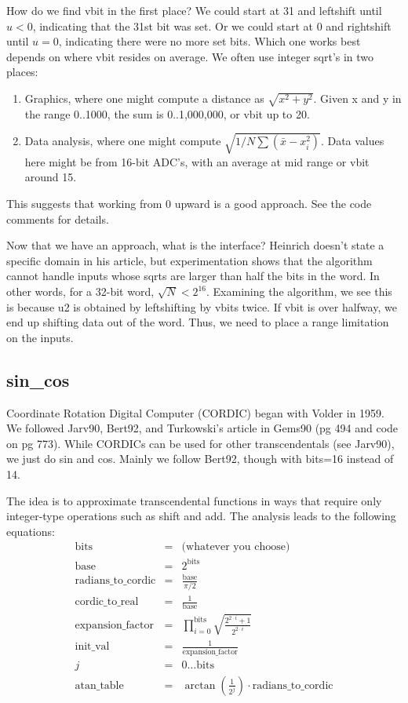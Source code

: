 How do we find vbit in the first place?  
We could start at 31 and leftshift 
until $u<0$, indicating that the 31st bit was set.  Or we could
start at 0 and rightshift until $u=0$, indicating there were no
more set bits. Which one works best depends on where vbit
resides on average.  We often use integer sqrt's in two places:
\begin{enumerate}
\item Graphics, where one might compute a distance as $\sqrt{x^2+y^2}$.  
Given x and y in the range 0..1000, the sum is 0..1,000,000, or
vbit up to 20.
\item Data analysis, where one might compute $\sqrt{1/N\sum{(\bar{x}-x_i^2)}}$.  
Data values here might be from 16-bit ADC's, with an average at mid range
or vbit around 15.  
\end{enumerate}

This suggests that working from 0 upward is a good approach.  
See the code comments for details.

Now that we have an approach, what is the interface?  Heinrich doesn't
state a specific domain in his article, but experimentation shows
that the algorithm cannot handle inputs whose sqrts are 
larger than half the bits in the word.  In other words, for a 32-bit word, 
$\sqrt{N} < 2^{16}$.  Examining the algorithm, we see this is because 
u2 is obtained by leftshifting by vbits twice.  If vbit is over
halfway, we end up shifting data out of the word.
Thus, we need to place a range limitation on the inputs.

\subsection*{sin\_cos}
Coordinate Rotation Digital Computer (CORDIC) began with Volder in 1959.
We followed Jarv90, Bert92, and Turkowski's article in Gems90 (pg
494 and code on pg 773). While CORDICs can be used for other 
transcendentals (see Jarv90), we just do sin and cos.  Mainly we
follow Bert92, though with bits=16 instead of 14.

The idea is to approximate transcendental functions in ways that
require only integer-type operations such as shift and add.  The analysis
leads to the following equations:
\begin{eqnarray}
\mbox{bits} & = & \mbox{(whatever you choose)}\\
\mbox{base} & = & 2^{\mbox{bits}}\\
\mbox{radians\_to\_cordic} & = & \frac{\mbox{base}}{\pi / 2}\\
\mbox{cordic\_to\_real} & = & \frac{1}{\mbox{base}}\\
\mbox{expansion\_factor} & = & \prod_{i=0}^{\mbox{bits}}
      \sqrt{\frac{2^{2 \cdot i}+1}{2^{2 \cdot i}}}\\
\mbox{init\_val} & = & \frac{1}{\mbox{expansion\_factor}}\\ 
j & = & 0 \ldots \mbox{bits}\\
\mbox{atan\_table} & = & \arctan (\frac{1}{2^j})
      \cdot \mbox{radians\_to\_cordic}
\end{eqnarray}

